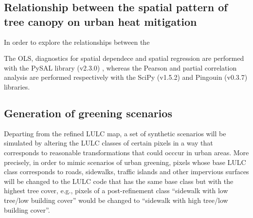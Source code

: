 \documentclass[12pt]{iopart}
\begin{document}
\subsection{Relationship between the spatial pattern of tree canopy on urban heat mitigation}

In order to explore the relationships between the

The OLS, diagnostics for spatial dependece and spatial regression are performed with the PySAL library (v2.3.0) \cite{rey2010pysal}, whereas the Pearson and partial correlation analysis are performed respectively with the SciPy (v1.5.2) \cite{virtanen2020scipy} and Pingouin (v0.3.7) \cite{vallat2018pingouin} libraries.



\subsection{Generation of greening scenarios}

Departing from the refined LULC map, a set of synthetic scenarios will be simulated by altering the LULC classes of certain pixels in a way that corresponds to reasonable transformations that could occcur in urban areas.
More precisely, in order to mimic scenarios of urban greening, pixels whose base LULC class corresponds to roads, sidewalks, traffic islands and other impervious surfaces will be changed to the LULC code that has the same base class but with the highest tree cover, e.g.,  pixels of a post-refinement class ``sidewalk with low tree/low building cover'' would be changed to ``sidewalk with high tree/low building cover''.
\end{document}
